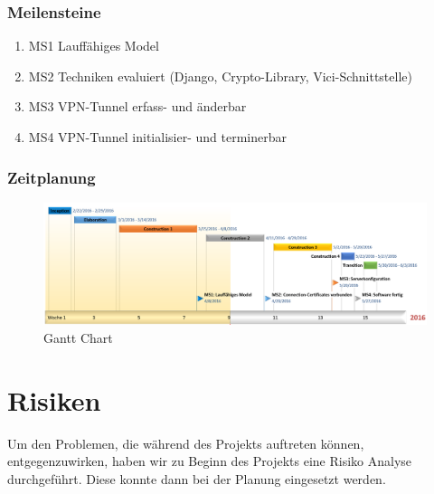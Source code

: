 \begin{landscape}
\subsubsection{Meilensteine}
\begin{enumerate}
	\item MS1 Lauffähiges Model
	\item MS2 Techniken evaluiert (Django, Crypto-Library, Vici-Schnittstelle)
	\item MS3 VPN-Tunnel erfass- und änderbar
	\item MS4 VPN-Tunnel initialisier- und terminerbar
\end{enumerate}
\subsubsection{Zeitplanung}
	\begin{figure}[H]
		\centering
		\includegraphics[width=250mm]{images/gantt.PNG}
		\caption{Gantt Chart}
	\end{figure}
\newpage
\section{Risiken}
Um den Problemen, die während des Projekts auftreten können, entgegenzuwirken, haben wir zu Beginn des Projekts eine Risiko Analyse durchgeführt. Diese konnte dann bei der Planung eingesetzt werden.


\end{landscape}
